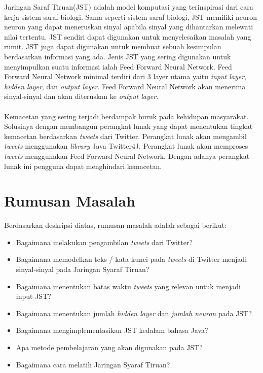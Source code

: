 \documentclass[a4paper,twoside]{article}
\begin{document}
Jaringan Saraf Tiruan(JST) adalah model komputasi yang terinspirasi dari cara kerja sistem saraf biologi. Sama seperti sistem saraf biologi, JST memiliki neuron-neuron yang dapat meneruskan sinyal apabila sinyal yang dihantarkan melewati nilai tertentu. JST sendiri dapat digunakan untuk menyelesaikan masalah yang rumit. JST juga dapat digunakan untuk membuat sebuah kesimpulan berdasarkan informasi yang ada. Jenis JST yang sering digunakan untuk menyimpulkan suatu informasi ialah Feed Forward Neural Network. Feed Forward Neural Network minimal terdiri dari 3 layer utama yaitu \textit{input layer}, \textit{hidden layer}, dan \textit{output layer}. Feed Forward Neural Network akan menerima sinyal-sinyal dan akan diteruskan ke \textit{output layer}.\\\\
Kemacetan yang sering terjadi berdampak buruk pada kehidupan masyarakat. Solusinya dengan membangun perangkat lunak yang dapat menentukan tingkat kemacetan berdasarkan \textit{tweets} dari Twitter. Perangkat lunak akan mengambil \textit{tweets} menggunakan \textit{library} Java Twitter4J. Perangkat lunak akan memproses \textit{tweets} menggunakan Feed Forward Neural Network. Dengan adanya perangkat lunak ini pengguna dapat menghindari kemacetan.
\section{Rumusan Masalah}
Berdasarkan deskripsi diatas, rumusan masalah adalah sebagai berikut:
\begin{itemize}
	\item Bagaimana melakukan pengambilan \textit{tweets} dari Twitter?
	\item Bagaimana memodelkan teks / kata kunci pada \textit{tweets} di Twitter menjadi sinyal-sinyal pada Jaringan Syaraf Tiruan?
	\item Bagaimana menentukan batas waktu \textit{tweets} yang relevan untuk menjadi input JST?
	\item Bagaimana menentukan jumlah \textit{hidden layer} dan \textit{jumlah neuron} pada JST?
	\item Bagaimana mengimplementasikan JST kedalam bahasa Java?
	\item Apa metode pembelajaran yang akan digunakan pada JST?
	\item Bagaimana cara melatih Jaringan Syaraf Tiruan?
\end{itemize}
\end{document}
